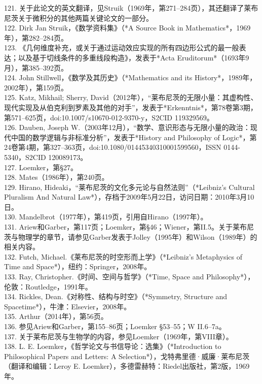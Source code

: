 121. 关于此论文的英文翻译，见Struik（1969年，第271–284页），其还翻译了莱布尼茨关于微积分的其他两篇关键论文的一部分。\\
122. Dirk Jan Struik，《数学资料集》（*A Source Book in Mathematics*，1969年），第282–284页。\\
123. 《几何维度补充，或关于通过运动效应实现的所有四边形公式的最一般表达；以及基于切线条件的多重线段构造》，发表于*Acta Eruditorum*（1693年9月），第385–392页。\\
124. John Stillwell，《数学及其历史》（*Mathematics and its History*，1989年，2002年），第159页。\\
125. Katz, Mikhail; Sherry, David（2012年），“莱布尼茨的无限小量：其虚构性、现代实现及从伯克利到罗素及其他的对手”，发表于*Erkenntnis*，第78卷第3期，第571–625页，doi:10.1007/s10670-012-9370-y，S2CID 119329569。\\
126. Dauben, Joseph W.（2003年12月），“数学、意识形态与无限小量的政治：现代中国的数学逻辑与非标准分析”，发表于*History and Philosophy of Logic*，第24卷第4期，第327–363页，doi:10.1080/01445340310001599560，ISSN 0144-5340，S2CID 120089173。\\
127. Loemker，第§27。\\
128. Mates（1986年），第240页。\\
129. Hirano, Hideaki，“莱布尼茨的文化多元论与自然法则”（*Leibniz's Cultural Pluralism And Natural Law*），存档于2009年5月22日，访问日期：2010年3月10日。\\
130. Mandelbrot（1977年），第419页，引用自Hirano（1997年）。\\
131. Ariew和Garber，第117页；Loemker，第§46；Wiener，第II.5。关于莱布尼茨与物理学的章节，请参见Garber发表于Jolley（1995年）和Wilson（1989年）的相关内容。\\
132. Futch, Michael.《莱布尼茨的时空形而上学》（*Leibniz's Metaphysics of Time and Space*），纽约：Springer，2008年。\\
133. Ray, Christopher.《时间、空间与哲学》（*Time, Space and Philosophy*），伦敦：Routledge，1991年。\\
134. Rickles, Dean.《对称性、结构与时空》（*Symmetry, Structure and Spacetime*），牛津：Elsevier，2008年。\\
135. Arthur（2014年），第56页。\\
136. 参见Ariew和Garber，第155–86页；Loemker §53–55；W II.6–7a。\\
137. 关于莱布尼茨与生物学的内容，参见Loemker（1969年，第VIII章）。\\
138. L. E. Loemker，《哲学论文与书信导论：选集》（*Introduction to Philosophical Papers and Letters: A Selection*），戈特弗里德·威廉·莱布尼茨（翻译和编辑：Leroy E. Loemker），多德雷赫特：Riedel出版社，第2版，1969年。\\
